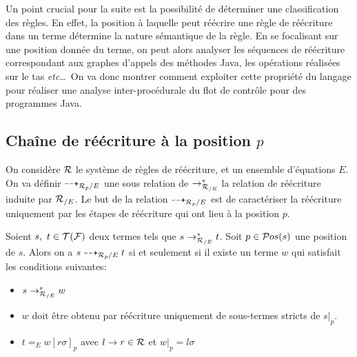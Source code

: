 Un point crucial pour la suite est la possibilité de déterminer une
classification des règles. En effet, la position à laquelle peut
réécrire une règle de réécriture dans un terme détermine la nature
sémantique de la règle. En se focalisant sur une position donnée du
terme, on peut alors analyser les séquences de réécriture
correspondant aux graphes d'appels des méthodes Java, les opérations
réalisées sur le tas \textit{etc}\dots\ On va donc montrer comment
exploiter cette propriété du langage pour réaliser une analyse
inter-procédurale du flot de contrôle pour des programmes Java.

\subsection{Chaîne de réécriture à la position $p$}

On considère $\mathcal R$ le système de règles de réécriture, et un ensemble d'équations $E$.
On va définir $\dashrightarrow_{\mathcal R_p/E}$ une sous relation de $\rightarrow_{\mathcal R_{/E}}^*$ la
relation de réécriture induite par ${\mathcal R_{/E}}$.  Le but de la relation
$\dashrightarrow_{\mathcal R_p/E}$ est de caractériser la réécriture uniquement par les
étapes de réécriture qui ont lieu à la position $p$.

\begin{definition}
  \label{def:arw}
  Soient $s,\ t \in \mathcal{T(F)}$ deux termes tels que $s \rightarrow_{\mathcal R_{/E}}^* t$.
  Soit $p \in \mathcal{ P}os(s)$ une position de $s$. Alors on a \textbf{$s \dashrightarrow_{\mathcal R_p/E} t$} si et seulement si
  il existe un terme $w$ qui satisfait les conditions suivantes:
  \begin{itemize}
  \item  $s \rightarrow_{\mathcal R_{/E}}^* w$
  \item $w$ doit être obtenu par réécriture uniquement de sous-termes stricts de $s|_p$.
  \item $t=_E w[r\sigma]_p$ avec $l\rightarrow r \in \mathcal R$ et $w|_p = l\sigma$
  \end{itemize}
\end{definition}

